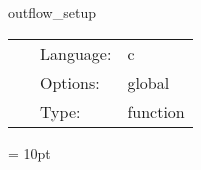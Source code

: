 \vspace{5mm}


\hspace{5mm} outflow\_setup 

\hspace{5mm}{\it set up global ompute data structures } 


\hspace{5mm}

 \begin{tabular*}{160mm}{cll} 
~ & Language:  & c \\ 
~ & Options:  & global \\ 
~ & Type:  & function \\ 
\end{tabular*} 



\vspace{5mm}\parskip = 10pt 
